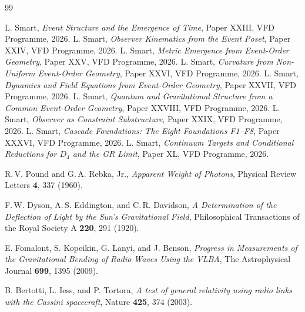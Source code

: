 \documentclass[12pt]{article}
\theoremstyle{definition}
\theoremstyle{remark}
\begin{document}

\begin{thebibliography}{99}

 L. Smart, \emph{Event Structure and the Emergence of Time}, Paper XXIII, VFD Programme, 2026.
 L. Smart, \emph{Observer Kinematics from the Event Poset}, Paper XXIV, VFD Programme, 2026.
 L. Smart, \emph{Metric Emergence from Event-Order Geometry}, Paper XXV, VFD Programme, 2026.
 L. Smart, \emph{Curvature from Non-Uniform Event-Order Geometry}, Paper XXVI, VFD Programme, 2026.
 L. Smart, \emph{Dynamics and Field Equations from Event-Order Geometry}, Paper XXVII, VFD Programme, 2026.
 L. Smart, \emph{Quantum and Gravitational Structure from a Common Event-Order Geometry}, Paper XXVIII, VFD Programme, 2026.
 L. Smart, \emph{Observer as Constraint Substructure}, Paper XXIX, VFD Programme, 2026.
 L. Smart, \emph{Cascade Foundations: The Eight Foundations F1--F8}, Paper XXXVI, VFD Programme, 2026.
 L. Smart, \emph{Continuum Targets and Conditional Reductions for $D_4$ and the GR Limit}, Paper XL, VFD Programme, 2026.

 R.\,V. Pound and G.\,A. Rebka, Jr., \emph{Apparent Weight of Photons}, Physical Review Letters \textbf{4}, 337 (1960).

 F.\,W. Dyson, A.\,S. Eddington, and C.\,R. Davidson, \emph{A Determination of the Deflection of Light by the Sun's Gravitational Field}, Philosophical Transactions of the Royal Society A \textbf{220}, 291 (1920).

 E. Fomalont, S. Kopeikin, G. Lanyi, and J. Benson, \emph{Progress in Measurements of the Gravitational Bending of Radio Waves Using the VLBA}, The Astrophysical Journal \textbf{699}, 1395 (2009).

 B. Bertotti, L. Iess, and P. Tortora, \emph{A test of general relativity using radio links with the Cassini spacecraft}, Nature \textbf{425}, 374 (2003).

\end{thebibliography}
\end{document}
